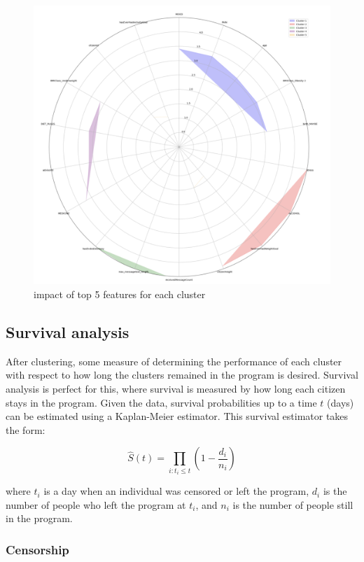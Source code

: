 \documentclass[12pt]{article}
\begin{document}
  \begin{figure}[h]
    \centering
    \includegraphics[width=0.7\linewidth]{images/top5_features.png}
    \caption{impact of top 5 features for each cluster}
    \label{fig:top5_features}
    \end{figure}

\subsection{Survival analysis}
	
	After clustering, some measure of determining the performance of each cluster with respect to how long the clusters remained in the program is desired. Survival analysis is perfect for this, where survival is measured by how long each citizen stays in the program. Given the data, survival probabilities up to a time $t$ (days) can be estimated using a Kaplan-Meier estimator. This survival estimator takes the form:
	
	$$
	\widehat{S}(t) = \prod_{i: t_i \leq t} \left( 1 - \frac{d_i}{n_i} \right)
	$$
	
	where $t_i$ is a day when an individual was censored or left the program, $d_i$ is the number of people who left the program at $t_i$, and $n_i$ is the number of people still in the program.
	
	
	
	\subsubsection{Censorship}
	
\end{document}
